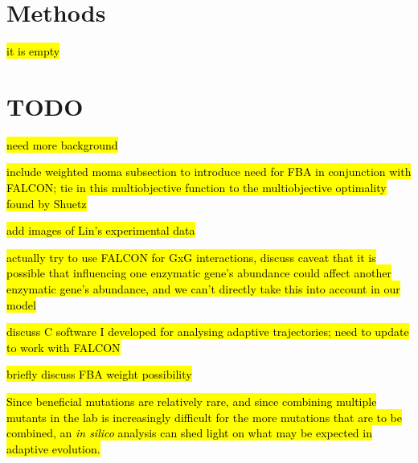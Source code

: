 \section{Methods}
\hl{it is empty}

\section{TODO}

\hl{need more background}


\hl{include weighted moma subsection to introduce need for FBA
in conjunction with FALCON; tie in this multiobjective function
to the multiobjective optimality found by Shuetz}

\hl{add images of Lin's experimental data}

\hl{actually try to use FALCON for GxG interactions, discuss caveat
that it is possible that influencing one enzymatic gene's abundance
could affect another enzymatic gene's abundance, and we can't directly
take this into account in our model}

\hl{discuss C software I developed for analysing adaptive trajectories;
need to update to work with FALCON}


\hl{briefly discuss FBA weight possibility}


\hl{Since beneficial mutations are relatively rare, and since
combining multiple mutants in the lab is increasingly difficult for
the more mutations that are to be combined, an \textit{in silico}
analysis can shed light on what may be expected in adaptive
evolution.}

